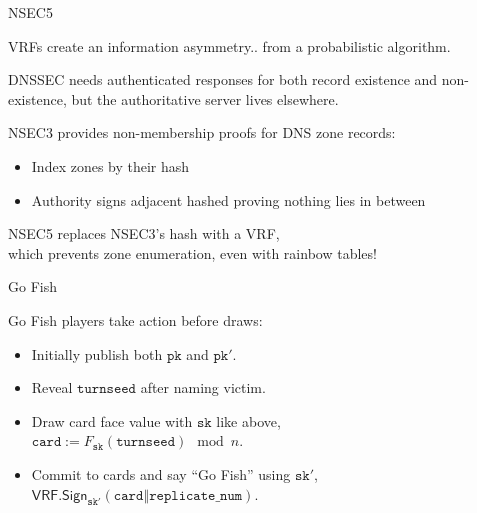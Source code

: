 \documentclass[fleqn,xcolor={usenames,dvipsnames},notes,aspectratio=169]{beamer} %
\newcommand{\algo}[1]{\ensuremath{\mathsf{#1}}}
\newcommand{\VRF}{\algo{VRF}}
\newcommand{\Sign}{\algo{Sign}}
\newcommand{\var}[1]{\ensuremath{\mathtt{#1}}}
\newcommand{\sk}{\var{sk}}
\newcommand{\pk}{\var{pk}}
\newcommand{\turnseed}{\var{turnseed}}
\newcommand\concatvert{\mathbin\Vert}
\begin{document}
\begin{frame}{NSEC5}


VRFs create an information asymmetry.. from a probabilistic algorithm.

\bigskip
\bigskip

DNSSEC needs authenticated responses for both record existence and non-existence,
\hspace*{20pt} but the authoritative server lives elsewhere. 

\bigskip

NSEC3 provides non-membership proofs for DNS zone records: \\
\begin{itemize}
\item Index zones by their hash
\item Authority signs adjacent hashed proving nothing lies in between
\end{itemize}

\bigskip

NSEC5 replaces NSEC3's hash with a VRF, \\
\hspace*{20pt} which prevents zone enumeration, even with rainbow tables!

\end{frame}



\begin{frame}{Go Fish}

\medskip

Go Fish players take action before draws: \\ \smallskip\smallskip
\begin{itemize}
\item Initially publish both $\pk$ and $\pk'$. \\ \smallskip
\item Reveal $\turnseed$ after naming victim. \\ \smallskip
\item Draw card face value with $\sk$ like above, \\ 
\hspace*{20pt}  $\var{card} := F_{\sk}(\turnseed) \mod n$. \\ \smallskip
\item Commit to cards and say ``Go Fish'' using $\sk'$, \\
\hspace*{20pt}  $\VRF.\Sign_{\sk'}( \var{card} \concatvert \var{replicate\_num} )$. \\ \smallskip
\end{itemize}

\end{frame}
\end{document}
